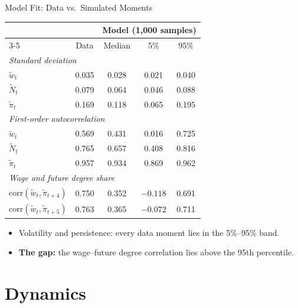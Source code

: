 \documentclass[10pt]{beamer}
\begin{document}
\begin{frame}{Model Fit: Data vs.\ Simulated Moments}
  \begin{table}
    \centering\small
    \begin{tabular}{lcccc}
      \toprule
      & & \multicolumn{3}{c}{Model (1,000 samples)} \\
      \cmidrule(lr){3-5}
      & Data & Median & 5\% & 95\% \\
      \midrule
      \multicolumn{5}{l}{\textit{Standard deviation}} \\
      \quad $\tilde w_t$ & 0.035 & 0.028 & 0.021 & 0.040 \\
      \quad $\tilde N_t$ & 0.079 & 0.064 & 0.046 & 0.088 \\
      \quad $\tilde\pi_t$ & 0.169 & 0.118 & 0.065 & 0.195 \\
      \multicolumn{5}{l}{\textit{First-order autocorrelation}} \\
      \quad $\tilde w_t$ & 0.569 & 0.431 & 0.016 & 0.725 \\
      \quad $\tilde N_t$ & 0.765 & 0.657 & 0.408 & 0.816 \\
      \quad $\tilde\pi_t$ & 0.957 & 0.934 & 0.869 & 0.962 \\
      \multicolumn{5}{l}{\textit{Wage and future degree share}} \\
      \quad corr$(\tilde w_t,\tilde\pi_{t+4})$ & \alert{0.750} & 0.352 & $-0.118$ & 0.691 \\
      \quad corr$(\tilde w_t,\tilde\pi_{t+5})$ & \alert{0.763} & 0.365 & $-0.072$ & 0.711 \\
      \bottomrule
    \end{tabular}
  \end{table}
  \begin{itemize}\small
    \item Volatility and persistence: every data moment lies in the 5\%--95\% band.
    \item \textbf{The gap:} the wage--future degree correlation lies \alert{above the 95th percentile}.
  \end{itemize}
\end{frame}

\section{Dynamics}
\end{document}
